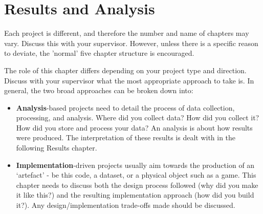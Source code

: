 \chapter{Results and Analysis}\label{chap:results-analysis}
\guideresults %

Each project is different, and therefore the number and name of chapters may vary. Discuss this with your supervisor. However, unless there is a specific reason to deviate, the 'normal' five chapter structure is encouraged.

The role of this chapter differs depending on your project type and direction. Discuss with your supervisor what the most appropriate approach to take is. In general, the two broad approaches can be broken down into:

\begin{itemize}[nosep]
    \item \textbf {Analysis}-based projects need to detail the process of data collection, processing, and analysis. Where did you collect data? How did you collect it? How did you store and process your data? An analysis is about how results were produced. The interpretation of these results is dealt with in the following Results chapter.
    \item \textbf {Implementation}-driven projects usually aim towards the production of an `artefact' - be this code, a dataset, or a physical object such as a game. This chapter needs to discuss both the design process followed (why did you make it like this?) and the resulting implementation approach (how did you build it?). Any design/implementation trade-offs made should be discussed.
\end{itemize}

